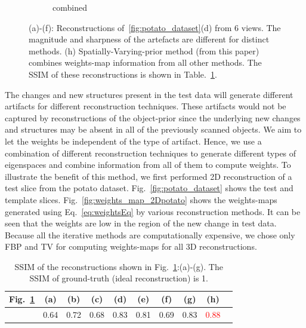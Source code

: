 \documentclass[journal]{IEEEtran}
\begin{document}
\begin{figure}[!h]
\begin{subfigure}[b]{0.24\linewidth}
        \caption{combined}
     \end{subfigure}
      \caption{(a)-(f): Reconstructions of~\ref{fig:potato_dataset}(d)
        from $6$ views. The magnitude and sharpness of the artefacts
        are different for distinct methods. (h)
        Spatially-Varying-prior method (from this paper) combines
        weights-map information from all other methods. The SSIM of
        these reconstructions is shown in
        Table.~\ref{table:potato_2D_ssim}.}
\label{fig:reconstructions_diff_methods}
\end{figure}

The changes and new structures present in the test data will generate
different artifacts for different reconstruction techniques. These
artifacts would not be captured by reconstructions of the object-prior
since the underlying new changes and structures may be absent in all
of the previously scanned objects. We aim to let the weights be
independent of the type of artifact. Hence, we use a combination of
different reconstruction techniques to generate different types of
eigenspaces and combine information from all of them to compute
weights. To illustrate the benefit of this method, we first performed
2D reconstruction of a test slice from the potato dataset.
Fig.~\ref{fig:potato_dataset} shows the test and template
slices. Fig.~\ref{fig:weights_map_2Dpotato} shows the weights-maps
generated using Eq.~\ref{eq:weightsEq} by various reconstruction
methods. It can be seen that the weights are low in the region of the
new change in test data. Because all the iterative methods are
computationally expensive, we chose only FBP and TV for
computing weights-maps for all 3D reconstructions.
\begin{table}[!h]
  \centering
\caption{SSIM of the reconstructions shown in Fig.~\ref{fig:reconstructions_diff_methods}:(a)-(g). The SSIM of ground-truth (ideal reconstruction) is 1.}
\begin{tabular}{|l|c|c|c|c|c|c|c|c|c|}
\hline
 Fig.~\ref{fig:reconstructions_diff_methods}  & \textbf{(a)} & \textbf{(b)} & \textbf{(c)} & \textbf{(d)} & \textbf{(e)} & \textbf{(f)} &  \textbf{(g)} &  \textbf{(h)} \\\hline
  & 0.64 & 0.72  & 0.68 & 0.83 & 0.81 & 0.69 & 0.83 &\textcolor{red}{0.88} \\ \hline
\end{tabular}
\label{table:potato_2D_ssim}
\end{table}
\end{document}
